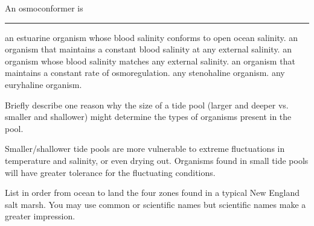\question{}
\vspace{0.7\baselineskip}
\question{}
\vspace{0.7\baselineskip}



\question{}


\question
An osmoconformer  is \rule{1in}{0.4pt}

\begin{choices}
\choice an estuarine organism whose blood salinity conforms to open ocean salinity. %
\choice an organism that maintains a constant blood salinity at any external salinity. %
\correctchoice an organism whose blood salinity matches any  external salinity. %
\choice an organism that maintains a constant rate of osmoregulation. %
\choice any stenohaline organism. %
\choice any euryhaline organism. %
\end{choices}


\question[5]
Briefly describe one reason why the size of a tide pool (larger and deeper vs. smaller and shallower) might determine the types of organisms present in the pool.
	\begin{solution}
	Smaller/shallower tide pools are more vulnerable to extreme fluctuations in temperature and salinity, or even drying out. Organisms found in small tide pools will have greater tolerance for the fluctuating conditions.
	\end{solution}


\question[5]
List in order from ocean to land the four zones found in a typical New England salt marsh. You may use common or scientific names but scientific names make a greater impression. 


